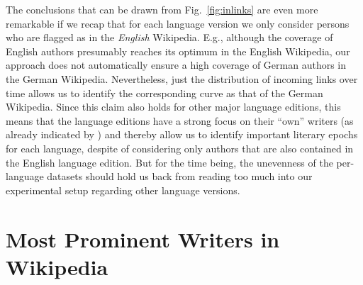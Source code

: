 \documentclass[a4paper,12pt]{scrartcl}
\begin{document}
The conclusions that can be drawn from Fig.~\ref{fig:inlinks} are even
more remarkable if we recap that for each language version we only
consider persons who are flagged as  in
the \emph{English} Wikipedia. E.g., although the coverage of English
authors presumably reaches its optimum in the English Wikipedia, our
approach does not automatically ensure a high coverage of German authors in the
German Wikipedia. Nevertheless, just the distribution of incoming
links over time allows us to identify the corresponding curve as that
of the German Wikipedia. Since this claim also holds for other major
language editions, this means that the language editions have a strong
focus on their ``own'' writers (as already indicated by
\cite{Callahan2011culturalbias}) and thereby allow us to identify
important literary epochs for each language, despite of considering
only authors that are also contained in the English language
edition. But for the time being, the unevenness of the per-language
datasets should hold us back from reading too much into our
experimental setup regarding other language versions.






\section{Most Prominent Writers in Wikipedia}\label{sec:most-import-writ}
\end{document}
